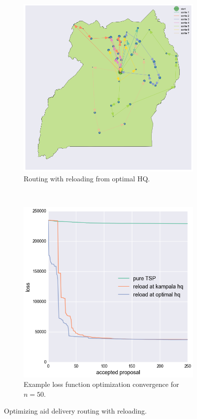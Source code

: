 \documentclass{article} %
\begin{document}
\begin{figure}[H]
  \centering
  \begin{subfigure}[b]{0.5\columnwidth}
    \centering
    \includegraphics[width=\textwidth]{figures/routing-reloading-hq-optimal}
    \caption{Routing with reloading from optimal HQ.}
    \label{fig:routing-reloading-hq-optimal}
  \end{subfigure}~\begin{subfigure}[b]{0.46\columnwidth}
    \centering
    \centering
    \includegraphics[width=\textwidth]{figures/comparative-loss-plot}
    \caption{Example loss function optimization convergence for $n=50$.}
    \label{fig:comparative-loss-plot}
  \end{subfigure}
  \caption{Optimizing aid delivery routing with reloading.}
\end{figure}
\end{document}
